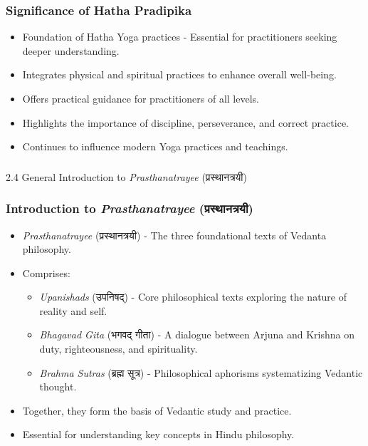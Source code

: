 \begin{frame}[fragile]\frametitle{Significance of Hatha Pradipika}

      \begin{itemize}
		\item Foundation of Hatha Yoga practices - Essential for practitioners seeking deeper understanding.
		\item Integrates physical and spiritual practices to enhance overall well-being.
		\item Offers practical guidance for practitioners of all levels.
		\item Highlights the importance of discipline, perseverance, and correct practice.
		\item Continues to influence modern Yoga practices and teachings.
	  \end{itemize}

\end{frame}


\begin{frame}[fragile]\frametitle{}
\begin{center}
{\Large 2.4 General Introduction to \textit{Prasthanatrayee} (प्रस्थानत्रयी)}
\end{center}
\end{frame}


\begin{frame}[fragile]\frametitle{Introduction to \textit{Prasthanatrayee} (प्रस्थानत्रयी)}

      \begin{itemize}
		\item \textit{Prasthanatrayee} (प्रस्थानत्रयी) - The three foundational texts of Vedanta philosophy.
		\item Comprises:
		  \begin{itemize}
		      \item \textit{Upanishads} (उपनिषद्) - Core philosophical texts exploring the nature of reality and self.
		      \item \textit{Bhagavad Gita} (भगवद् गीता) - A dialogue between Arjuna and Krishna on duty, righteousness, and spirituality.
		      \item \textit{Brahma Sutras} (ब्रह्म सूत्र) - Philosophical aphorisms systematizing Vedantic thought.
		  \end{itemize}
		\item Together, they form the basis of Vedantic study and practice.
		\item Essential for understanding key concepts in Hindu philosophy.
	  \end{itemize}

\end{frame}

